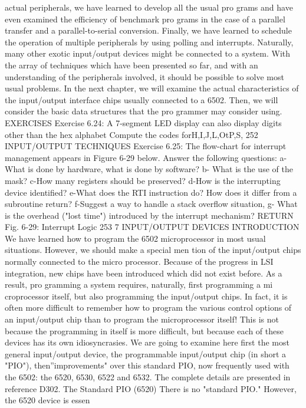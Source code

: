 actual peripherals, we have learned to develop all the usual pro
grams and have even examined the efficiency of benchmark pro
grams in the case of a parallel transfer and a parallel-to-serial
conversion. Finally, we have learned to schedule the operation of
multiple peripherals by using polling and interrupts. Naturally,
many other exotic input/output devices might be connected to a
system. With the array of techniques which have been presented
so far, and with an understanding of the peripherals involved, it
should be possible to solve most usual problems.
In the next chapter, we will examine the actual characteristics
of the input/output interface chips usually connected to a 6502.
Then, we will consider the basic data structures that the pro
grammer may consider using.
EXERCISES
Exercise 6.24: A 7-segment LED display can also display digits
other than the hex alphabet Compute the codes forH,I,J,L,OtP,S,
252
INPUT/OUTPUT TECHNIQUES
Exercise 6.25: The flow-chart for interrupt management appears
in Figure 6-29 below. Answer the following questions:
a-What is done by hardware, what is done by software?
b- What is the use of the mask?
c-How many registers should be preserved?
d-How is the interrupting device identified?
e-What does the RTI instruction do? How does it differ from
a subroutine return?
f-Suggest a way to handle a stack overflow situation,
g- What is the overhead ("lost time") introduced by the interrupt
mechanism?
RETURN
Fig. 6-29: Interrupt Logic
253
7
INPUT/OUTPUT DEVICES
INTRODUCTION
We have learned how to program the 6502 microprocessor in
most usual situations. However, we should make a special men
tion of the input/output chips normally connected to the micro
processor. Because of the progress in LSI integration, new chips
have been introduced which did not exist before. As a result, pro
gramming a system requires, naturally, first programming a mi
croprocessor itself, but also programming the input/output chips.
In fact, it is often more difficult to remember how to program the
various control options of an input/output chip than to program
the microprocessor itself! This is not because the programming in
itself is more difficult, but because each of these devices has its
own idiosyncrasies. We are going to examine here first the most
general input/output device, the programmable input/output chip
(in short a "PIO"), then''improvements" over this standard PIO,
now frequently used with the 6502: the 6520, 6530, 6522 and
6532. The complete details are presented in reference D302.
The Standard PIO (6520)
There is no "standard PIO." However, the 6520 device is essen
